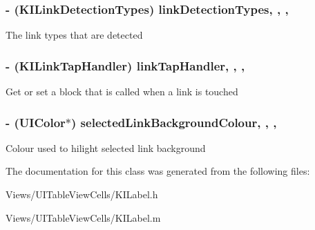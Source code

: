 \subsubsection[{link\+Detection\+Types}]{\setlength{\rightskip}{0pt plus 5cm}-\/ (K\+I\+Link\+Detection\+Types) link\+Detection\+Types\hspace{0.3cm}{\ttfamily [read]}, {\ttfamily [write]}, {\ttfamily [nonatomic]}, {\ttfamily [assign]}}\label{interface_k_i_label_a0430592250bca24449465bc33abc6c5c}
The link types that are detected \hypertarget{interface_k_i_label_afe21f3eadca6a1aeca6081f4a075cbd9}{}
\subsubsection[{link\+Tap\+Handler}]{\setlength{\rightskip}{0pt plus 5cm}-\/ (K\+I\+Link\+Tap\+Handler) link\+Tap\+Handler\hspace{0.3cm}{\ttfamily [read]}, {\ttfamily [write]}, {\ttfamily [nonatomic]}, {\ttfamily [copy]}}\label{interface_k_i_label_afe21f3eadca6a1aeca6081f4a075cbd9}
Get or set a block that is called when a link is touched \hypertarget{interface_k_i_label_a772174afd3598ed42c8f2e65b3d2803f}{}
\subsubsection[{selected\+Link\+Background\+Colour}]{\setlength{\rightskip}{0pt plus 5cm}-\/ (U\+I\+Color$\ast$) selected\+Link\+Background\+Colour\hspace{0.3cm}{\ttfamily [read]}, {\ttfamily [write]}, {\ttfamily [nonatomic]}, {\ttfamily [copy]}}\label{interface_k_i_label_a772174afd3598ed42c8f2e65b3d2803f}
Colour used to hilight selected link background 

The documentation for this class was generated from the following files\+:\begin{DoxyCompactItemize}
\item 
Views/\+U\+I\+Table\+View\+Cells/K\+I\+Label.\+h\item 
Views/\+U\+I\+Table\+View\+Cells/K\+I\+Label.\+m\end{DoxyCompactItemize}

